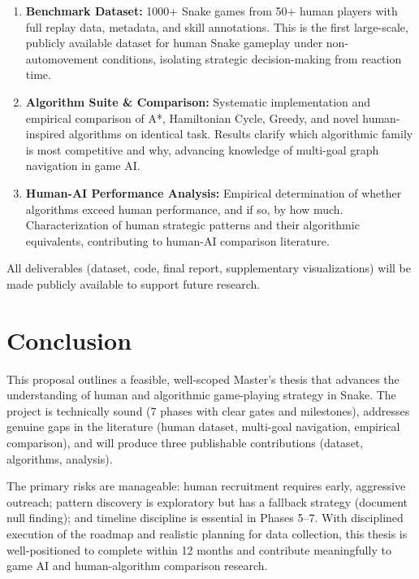 \documentclass[a4paper]{article}
\begin{document}
\begin{enumerate}
\item \textbf{Benchmark Dataset:} 1000+ Snake games from 50+ human players with full replay data, metadata, and skill annotations. This is the first large-scale, publicly available dataset for human Snake gameplay under non-automovement conditions, isolating strategic decision-making from reaction time.

\item \textbf{Algorithm Suite \& Comparison:} Systematic implementation and empirical comparison of A*, Hamiltonian Cycle, Greedy, and novel human-inspired algorithms on identical task. Results clarify which algorithmic family is most competitive and why, advancing knowledge of multi-goal graph navigation in game AI.

\item \textbf{Human-AI Performance Analysis:} Empirical determination of whether algorithms exceed human performance, and if so, by how much. Characterization of human strategic patterns and their algorithmic equivalents, contributing to human-AI comparison literature.

\end{enumerate}

All deliverables (dataset, code, final report, supplementary visualizations) will be made publicly available to support future research.

\section{Conclusion}

This proposal outlines a feasible, well-scoped Master's thesis that advances the understanding of human and algorithmic game-playing strategy in Snake. The project is technically sound (7 phases with clear gates and milestones), addresses genuine gaps in the literature (human dataset, multi-goal navigation, empirical comparison), and will produce three publishable contributions (dataset, algorithms, analysis).

The primary risks are manageable: human recruitment requires early, aggressive outreach; pattern discovery is exploratory but has a fallback strategy (document null finding); and timeline discipline is essential in Phases 5--7. With disciplined execution of the roadmap and realistic planning for data collection, this thesis is well-positioned to complete within 12 months and contribute meaningfully to game AI and human-algorithm comparison research.
\end{document}
